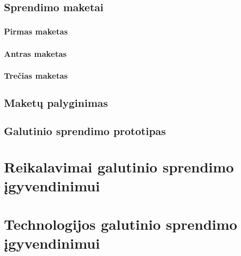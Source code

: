 \documentclass{VUMIFPSkursinis}
\begin{document}
\subsection{Sprendimo maketai}
\subsubsection{Pirmas maketas}

\subsubsection{Antras maketas}
\subsubsection{Trečias maketas}

\subsection{Maketų palyginimas}
\subsection{Galutinio sprendimo prototipas}

\section{Reikalavimai galutinio sprendimo įgyvendinimui}
\section{Technologijos galutinio sprendimo įgyvendinimui}




\printbibliography[heading=bibintoc, title=Šaltiniai]  %
\end{document}
